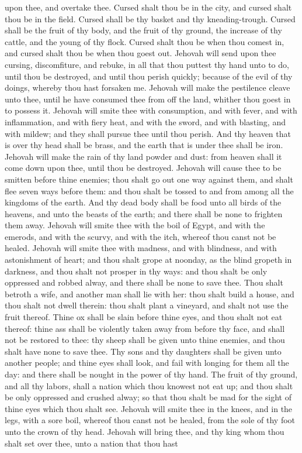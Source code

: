 upon thee, and overtake thee. Cursed shalt thou be in the city, and cursed shalt thou be in the field. Cursed shall be thy basket and thy kneading-trough. Cursed shall be the fruit of thy body, and the fruit of thy ground, the increase of thy cattle, and the young of thy flock. Cursed shalt thou be when thou comest in, and cursed shalt thou be when thou goest out.  Jehovah will send upon thee cursing, discomfiture, and rebuke, in all that thou puttest thy hand unto to do, until thou be destroyed, and until thou perish quickly; because of the evil of thy doings, whereby thou hast forsaken me. Jehovah will make the pestilence cleave unto thee, until he have consumed thee from off the land, whither thou goest in to possess it. Jehovah will smite thee with consumption, and with fever, and with inflammation, and with fiery heat, and with the sword, and with blasting, and with mildew; and they shall pursue thee until thou perish. And thy heaven that is over thy head shall be brass, and the earth that is under thee shall be iron. Jehovah will make the rain of thy land powder and dust: from heaven shall it come down upon thee, until thou be destroyed.  Jehovah will cause thee to be smitten before thine enemies; thou shalt go out one way against them, and shalt flee seven ways before them: and thou shalt be tossed to and from among all the kingdoms of the earth. And thy dead body shall be food unto all birds of the heavens, and unto the beasts of the earth; and there shall be none to frighten them away. Jehovah will smite thee with the boil of Egypt, and with the emerods, and with the scurvy, and with the itch, whereof thou canst not be healed. Jehovah will smite thee with madness, and with blindness, and with astonishment of heart; and thou shalt grope at noonday, as the blind gropeth in darkness, and thou shalt not prosper in thy ways: and thou shalt be only oppressed and robbed alway, and there shall be none to save thee. Thou shalt betroth a wife, and another man shall lie with her: thou shalt build a house, and thou shalt not dwell therein: thou shalt plant a vineyard, and shalt not use the fruit thereof. Thine ox shall be slain before thine eyes, and thou shalt not eat thereof: thine ass shall be violently taken away from before thy face, and shall not be restored to thee: thy sheep shall be given unto thine enemies, and thou shalt have none to save thee. Thy sons and thy daughters shall be given unto another people; and thine eyes shall look, and fail with longing for them all the day: and there shall be nought in the power of thy hand. The fruit of thy ground, and all thy labors, shall a nation which thou knowest not eat up; and thou shalt be only oppressed and crushed alway; so that thou shalt be mad for the sight of thine eyes which thou shalt see. Jehovah will smite thee in the knees, and in the legs, with a sore boil, whereof thou canst not be healed, from the sole of thy foot unto the crown of thy head.  Jehovah will bring thee, and thy king whom thou shalt set over thee, unto a nation that thou hast 